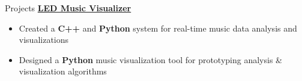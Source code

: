 \documentclass{resume/resume}
\begin{document}
\begin{rSection}{Projects}
    \href{https://www.linkedin.com/feed/update/urn:li:activity:6603722406240628736/}{\bf LED Music Visualizer}
    \vspace{-6pt}
    \begin{itemize}[nosep]
      \item Created a {\bf C++} and {\bf Python} system for real-time music data analysis and visualizations
      \item Designed a {\bf Python} music visualization tool for prototyping analysis \& visualization algorithms
    \end{itemize}

    

\end{rSection}
\end{document}
